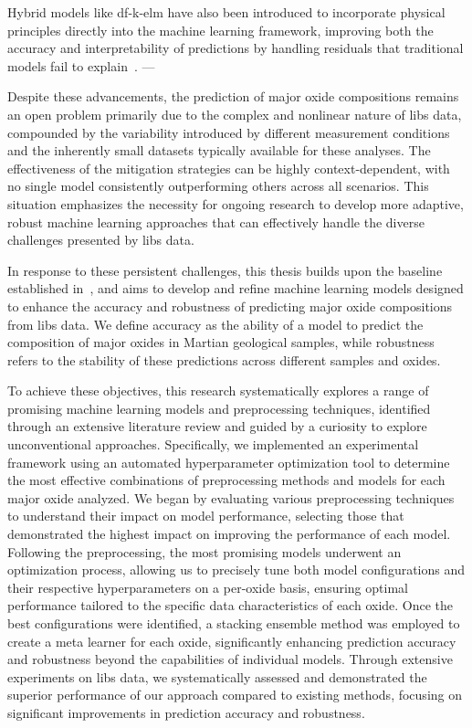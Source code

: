 Hybrid models like \gls{df}-\gls{k-elm} have also been introduced to incorporate physical principles directly into the machine learning framework, improving both the accuracy and interpretability of predictions by handling residuals that traditional models fail to explain~\cite{song_DF-K-ELM}. 
---

Despite these advancements, the prediction of major oxide compositions remains an open problem primarily due to the complex and nonlinear nature of \gls{libs} data, compounded by the variability introduced by different measurement conditions and the inherently small datasets typically available for these analyses. 
The effectiveness of the mitigation strategies can be highly context-dependent, with no single model consistently outperforming others across all scenarios. 
This situation emphasizes the necessity for ongoing research to develop more adaptive, robust machine learning approaches that can effectively handle the diverse challenges presented by \gls{libs} data.

In response to these persistent challenges, this thesis builds upon the baseline established in~\citet{p9_paper}, and aims to develop and refine machine learning models designed to enhance the accuracy and robustness of predicting major oxide compositions from \gls{libs} data. 
We define accuracy as the ability of a model to predict the composition of major oxides in Martian geological samples, while robustness refers to the stability of these predictions across different samples and oxides.

To achieve these objectives, this research systematically explores a range of promising machine learning models and preprocessing techniques, identified through an extensive literature review and guided by a curiosity to explore unconventional approaches. 
Specifically, we implemented an experimental framework using an automated hyperparameter optimization tool to determine the most effective combinations of preprocessing methods and models for each major oxide analyzed. 
We began by evaluating various preprocessing techniques to understand their impact on model performance, selecting those that demonstrated the highest impact on improving the performance of each model.
Following the preprocessing, the most promising models underwent an optimization process, allowing us to precisely tune both model configurations and their respective hyperparameters on a per-oxide basis, ensuring optimal performance tailored to the specific data characteristics of each oxide. 
Once the best configurations were identified, a stacking ensemble method was employed to create a meta learner for each oxide, significantly enhancing prediction accuracy and robustness beyond the capabilities of individual models. 
Through extensive experiments on \gls{libs} data, we systematically assessed and demonstrated the superior performance of our approach compared to existing methods, focusing on significant improvements in prediction accuracy and robustness.

